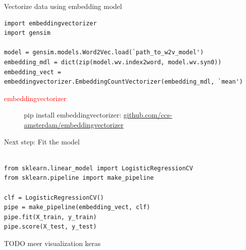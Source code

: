 \documentclass{beamer}
\begin{document}
\begin{frame}[fragile]{Vectorize data using embedding model}
\begin{lstlisting}
import embeddingvectorizer
import gensim

model = gensim.models.Word2Vec.load(`path_to_w2v_model')  
embedding_mdl = dict(zip(model.wv.index2word, model.wv.syn0)) 
embedding_vect = embeddingvectorizer.EmbeddingCountVectorizer(embedding_mdl, `mean') 

\end{lstlisting}

{\footnotesize 
	\begin{description}
		\item[\textcolor{red}{embeddingvectorizer}] pip install embeddingvectorizer: \url{github.com/ccs-amsterdam/embeddingvectorizer} 
	\end{description}
}

\end{frame}

\begin{frame}[fragile]{Next step: Fit the model}
\begin{lstlisting}

from sklearn.linear_model import LogisticRegressionCV
from sklearn.pipeline import make_pipeline

clf = LogisticRegressionCV()
pipe = make_pipeline(embedding_vect, clf)
pipe.fit(X_train, y_train)
pipe.score(X_test, y_test)
\end{lstlisting}

\end{frame}

\begin{frame}[plain]
\huge

TODO
meer visualization
keras


\end{frame}
\end{document}
